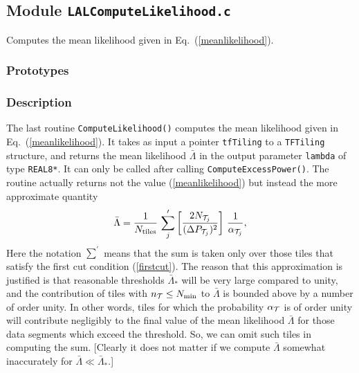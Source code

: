 \newpage
\subsection{Module \texttt{LALComputeLikelihood.c}}
\label{ss:LALComputeLikelihood.c}

Computes the mean likelihood given in Eq.\ (\ref{meanlikelihood}).

\subsubsection*{Prototypes}
\vspace{0.1in}


\subsubsection*{Description}

The last routine \verb+ComputeLikelihood()+ computes the mean likelihood given
in Eq.\ (\ref{meanlikelihood}).  It takes as input a pointer \verb+tfTiling+
to a \verb+TFTiling+ structure, and returns the mean likelihood ${\bar
\Lambda}$ in the output parameter \verb+lambda+ of type \verb+REAL8*+.  It can
only be called after calling \verb+ComputeExcessPower()+.  The routine
actually returns not the value (\ref{meanlikelihood}) but instead the more
approximate quantity  
\begin{equation}
{\bar \Lambda} = {1 \over N_{\rm tiles}} \, \sum_j^\prime \left[{2 N_{{\cal
T}_j} \over (\Delta P_{{\cal T}_j})^2 } \right] \, {1 \over
\alpha_{{\cal T}_j}},
\label{meanlikelihood1}
\end{equation}
Here the notation $\sum^\prime$ means that the sum is taken only over those
tiles that satisfy the first cut condition (\ref{firstcut}).  The reason that
this approximation is justified is that reasonable thresholds ${\bar
\Lambda}_*$ will be very large compared to unity, and the contribution of
tiles with $n_{\cal T} \le N_{\rm min}$ to ${\bar \Lambda}$ is bounded above
by a number of order unity.  In other words, tiles for which the probability
$\alpha_{\cal T}$ is of order unity will contribute negligibly to the final
value of the mean likelihood ${\bar \Lambda}$ for those data segments which
exceed the threshold.  So, we can omit such tiles in computing the sum.
[Clearly it does not matter if we compute ${\bar \Lambda}$ somewhat
inaccurately for ${\bar \Lambda} \ll {\bar \Lambda}_*$.] 

